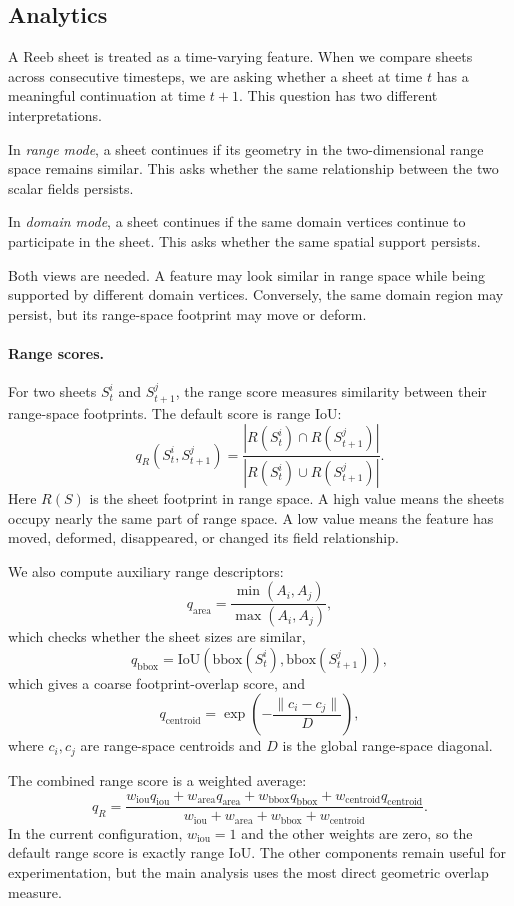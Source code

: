 \subsection{Analytics}
  \label{sec:analytics}

  A Reeb sheet is treated as a time-varying feature. When we compare sheets across consecutive timesteps, we are asking whether a sheet at time $t$ has a meaningful continuation at time $t+1$. This question has two different interpretations.

  In \emph{range mode}, a sheet continues if its geometry in the two-dimensional range space remains similar. This asks
  whether the same relationship between the two scalar fields persists.

  In \emph{domain mode}, a sheet continues if the same domain vertices continue to participate in the sheet. This asks
  whether the same spatial support persists.

  Both views are needed. A feature may look similar in range space while being supported by different domain vertices.
  Conversely, the same domain region may persist, but its range-space footprint may move or deform.

  \paragraph{Range scores.}
  For two sheets $S_t^i$ and $S_{t+1}^j$, the range score measures similarity between their range-space footprints. The
  default score is range IoU:
  \[
  q_R(S_t^i,S_{t+1}^j)
  =
  \frac{
  |R(S_t^i) \cap R(S_{t+1}^j)|
  }{
  |R(S_t^i) \cup R(S_{t+1}^j)|
  }.
  \]
  Here $R(S)$ is the sheet footprint in range space. A high value means the sheets occupy nearly the same part of range
  space. A low value means the feature has moved, deformed, disappeared, or changed its field relationship.

  We also compute auxiliary range descriptors:
  \[
  q_{\mathrm{area}} =
  \frac{\min(A_i,A_j)}{\max(A_i,A_j)},
  \]
  which checks whether the sheet sizes are similar,
  \[
  q_{\mathrm{bbox}}
  =
  \mathrm{IoU}(\mathrm{bbox}(S_t^i),\mathrm{bbox}(S_{t+1}^j)),
  \]
  which gives a coarse footprint-overlap score, and
  \[
  q_{\mathrm{centroid}}
  =
  \exp\left(
  -\frac{\|c_i-c_j\|}{D}
  \right),
  \]
  where $c_i,c_j$ are range-space centroids and $D$ is the global range-space diagonal.

  The combined range score is a weighted average:
  \[
  q_R =
  \frac{
  w_{\mathrm{iou}}q_{\mathrm{iou}}
  +w_{\mathrm{area}}q_{\mathrm{area}}
  +w_{\mathrm{bbox}}q_{\mathrm{bbox}}
  +w_{\mathrm{centroid}}q_{\mathrm{centroid}}
  }{
  w_{\mathrm{iou}}+w_{\mathrm{area}}+w_{\mathrm{bbox}}+w_{\mathrm{centroid}}
  }.
  \]
  In the current configuration, $w_{\mathrm{iou}}=1$ and the other weights are zero, so the default range score is exactly
  range IoU. The other components remain useful for experimentation, but the main analysis uses the most direct geometric
  overlap measure.

